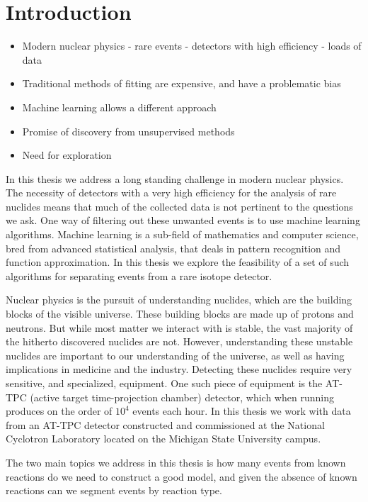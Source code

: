 \chapter{Introduction}\label{ch:introduction}

\begin{itemize}
\item Modern nuclear physics - rare events - detectors with high efficiency - loads of data 
\item Traditional methods of fitting are expensive, and have a problematic bias 
\item Machine learning allows a different approach
\item Promise of discovery from unsupervised methods 
\item Need for exploration 
\end{itemize}

In this thesis we address a long standing challenge in modern nuclear physics. The necessity of detectors with a very high efficiency for the analysis of rare nuclides means that much of the collected data is not pertinent to the questions we ask. One way of filtering out these unwanted events is to use machine learning algorithms. Machine learning is a sub-field of mathematics and computer science, bred from advanced statistical analysis, that deals in pattern recognition and function approximation. In this thesis we explore the feasibility of a set of such algorithms for separating events from a rare isotope detector.

Nuclear physics is the pursuit of understanding nuclides, which are the building blocks of the visible universe. These building blocks are made up of protons and neutrons. But while most matter we interact with is stable, the vast majority of the hitherto discovered nuclides are not. However, understanding these unstable nuclides are important to our understanding of the universe, as well as having implications in medicine and the industry. Detecting these nuclides require very sensitive, and specialized, equipment. One such piece of equipment is the AT-TPC (active target time-projection chamber) detector, which when running produces on the order of $10^4$ events each hour. In this thesis we work with data from an AT-TPC detector constructed and commissioned at the National Cyclotron Laboratory located on the Michigan State University campus. 

The two main topics we address in this thesis is how many events from known reactions do we need to construct a good model, and given the absence of known reactions can we segment events by reaction type. 

